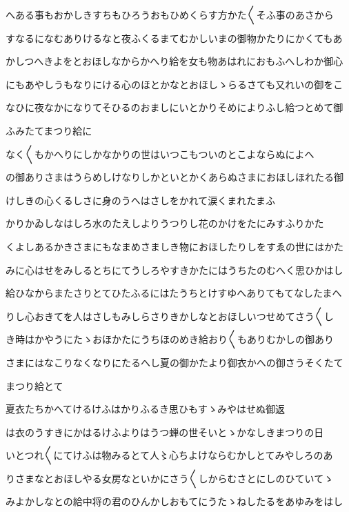 \documentclass[a4paper,11pt,landscape]{ltjtarticle}
\begin{document}
\par\medskip
へある事もおかしきすちもひろうおもひめくらす方かた〱そふ事のあさから
\par\medskip
すなるになむありけるなと夜ふくるまてむかしいまの御物かたりにかくてもあ
\par\medskip
かしつへきよをとおほしなからかへり給を女も物あはれにおもふへしわか御心
\par\medskip
にもあやしうもなりにける心のほとかなとおほしゝらるさても又れいの御をこ
\par\medskip
なひに夜なかになりてそひるのおましにいとかりそめによりふし給つとめて御
\par\medskip
ふみたてまつり給に
\par\medskip
なく〱もかへりにしかなかりの世はいつこもついのとこよならぬによへ
\par\medskip
の御ありさまはうらめしけなりしかといとかくあらぬさまにおほしほれたる御
\par\medskip
けしきの心くるしさに身のうへはさしをかれて涙くまれたまふ
\par\medskip
かりかゐしなはしろ水のたえしよりうつりし花のかけをたにみすふりかた
\par\medskip
くよしあるかきさまにもなまめさましき物におほしたりしをすゑの世にはかた
\par\medskip
みに心はせをみしるとちにてうしろやすきかたにはうちたのむへく思ひかはし
\par\medskip
給ひなからまたさりとてひたふるにはたうちとけすゆへありてもてなしたまへ
\par\medskip
りし心おきてを人はさしもみしらさりきかしなとおほしいつせめてさう〱し
\par\medskip
き時はかやうにたゝおほかたにうちほのめき給おり〱もありむかしの御あり
\par\medskip
さまにはなこりなくなりにたるへし夏の御かたより御衣かへの御さうそくたて
\par\medskip
まつり給とて
\par\medskip
夏衣たちかへてけるけふはかりふるき思ひもすゝみやはせぬ御返
\par\medskip
は衣のうすきにかはるけふよりはうつ蝉の世そいとゝかなしきまつりの日
\par\medskip
いとつれ〱にてけふは物みるとて人〻心ちよけならむかしとてみやしろのあ
\par\medskip
りさまなとおほしやる女房なといかにさう〱しからむさとにしのひていてゝ
\par\medskip
みよかしなとの給中将の君のひんかしおもてにうたゝねしたるをあゆみをはし
\par\medskip
\end{document}
